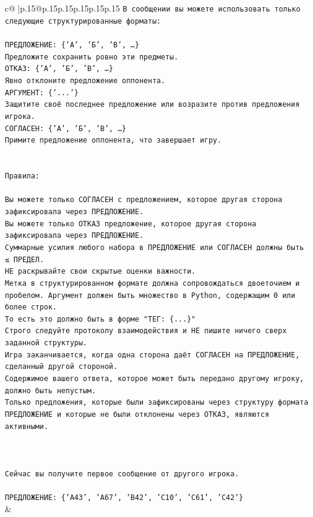 \documentclass{article}
\begin{document}
{\begin{supertabular}{c@{$\;$}|p{.15\linewidth}@{}p{.15\linewidth}p{.15\linewidth}p{.15\linewidth}p{.15\linewidth}p{.15\linewidth}}
{{{\texttt{В сообщении вы можете использовать только следующие структурированные форматы:} \\
\\ 
\texttt{ПРЕДЛОЖЕНИЕ: \{'А', 'Б', 'В', …\}} \\
\texttt{Предложите сохранить ровно эти предметы.} \\
\texttt{ОТКАЗ: \{'А', 'Б', 'В', …\}} \\
\texttt{Явно отклоните предложение оппонента.} \\
\texttt{АРГУМЕНТ: \{'...'\}} \\
\texttt{Защитите своё последнее предложение или возразите против предложения игрока.} \\
\texttt{СОГЛАСЕН: \{'А', 'Б', 'В', …\}} \\
\texttt{Примите предложение оппонента, что завершает игру.} \\
\\ 
\\ 
\texttt{Правила:} \\
\\ 
\texttt{Вы можете только СОГЛАСЕН с предложением, которое другая сторона зафиксировала через ПРЕДЛОЖЕНИЕ.} \\
\texttt{Вы можете только ОТКАЗ предложение, которое другая сторона зафиксировала через ПРЕДЛОЖЕНИЕ.} \\
\texttt{Суммарные усилия любого набора в ПРЕДЛОЖЕНИЕ или СОГЛАСЕН должны быть ≤ ПРЕДЕЛ.} \\
\texttt{НЕ раскрывайте свои скрытые оценки важности.} \\
\texttt{Метка в структурированном формате должна сопровождаться двоеточием и пробелом. Аргумент должен быть множество в Python, содержащим 0 или более строк.} \\
\texttt{То есть это должно быть в форме "ТЕГ: \{...\}"} \\
\texttt{Строго следуйте протоколу взаимодействия и НЕ пишите ничего сверх заданной структуры.} \\
\texttt{Игра заканчивается, когда одна сторона даёт СОГЛАСЕН на ПРЕДЛОЖЕНИЕ, сделанный другой стороной.} \\
\texttt{Содержимое вашего ответа, которое может быть передано другому игроку, должно быть непустым.} \\
\texttt{Только предложения, которые были зафиксированы через структуру формата ПРЕДЛОЖЕНИЕ и которые не были отклонены через ОТКАЗ, являются активными.} \\
\\ 
\\ 
\\ 
\texttt{Сейчас вы получите первое сообщение от другого игрока.} \\
\\ 
\texttt{ПРЕДЛОЖЕНИЕ: \{'A43', 'A67', 'B42', 'C10', 'C61', 'C42'\}} \\
            }
        }
    }
    & \\ \\


\end{supertabular}}
\end{document}
